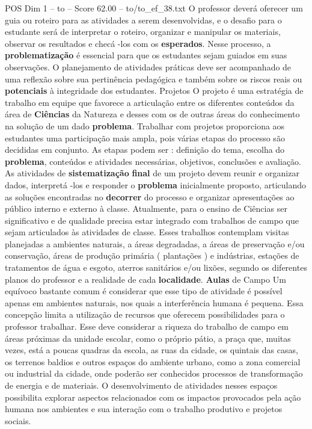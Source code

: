 \begin{textsample}{POS Dim 1 – to – Score 62.00 – to/to\_ef\_38.txt}
O professor deverá oferecer um guia ou roteiro para as atividades a serem desenvolvidas, e o desafio para o estudante será de interpretar o roteiro, organizar e manipular os materiais, observar os resultados e checá -los com os \textbf{esperados}.
Nesse processo, a \textbf{problematização} é essencial para que os estudantes sejam guiados em suas observações.
O planejamento de atividades práticas deve ser acompanhado de uma reflexão sobre sua pertinência pedagógica e também sobre os riscos reais ou \textbf{potenciais} à integridade dos estudantes.
Projetos O projeto é uma estratégia de trabalho em equipe que favorece a articulação entre os diferentes conteúdos da área de \textbf{Ciências} da Natureza e desses com os de outras áreas do conhecimento na solução de um dado \textbf{problema}.
Trabalhar com projetos proporciona aos estudantes uma participação mais ampla, pois várias etapas do processo são decididas em conjunto.
As etapas podem ser : definição do tema, escolha do \textbf{problema}, conteúdos e atividades necessárias, objetivos, conclusões e avaliação.
As atividades de \textbf{sistematização} \textbf{final} de um projeto devem reunir e organizar dados, interpretá -los e responder o \textbf{problema} inicialmente proposto, articulando as soluções encontradas no \textbf{decorrer} do processo e organizar apresentações ao público interno e externo à classe.
Atualmente, para o ensino de Ciências ser significativo e de qualidade precisa estar integrado com trabalhos de campo que sejam articulados às atividades de classe.
Esses trabalhos contemplam visitas planejadas a ambientes naturais, a áreas degradadas, a áreas de preservação e/ou conservação, áreas de produção primária ( plantações ) e indústrias, estações de tratamentos de água e esgoto, aterros sanitários e/ou lixões, segundo os diferentes planos do professor e a realidade de cada \textbf{localidade}. \textbf{Aulas} de Campo Um equívoco bastante comum é considerar que esse tipo de atividade é possível apenas em ambientes naturais, nos quais a interferência humana é pequena.
Essa concepção limita a utilização de recursos que oferecem possibilidades para o professor trabalhar.
Esse deve considerar a riqueza do trabalho de campo em áreas próximas da unidade escolar, como o próprio pátio, a praça que, muitas vezes, está a poucas quadras da escola, as ruas da cidade, os quintais das casas, os terrenos baldios e outros espaços do ambiente urbano, como a zona comercial ou industrial da cidade, onde poderão ser conhecidos processos de transformação de energia e de materiais.
O desenvolvimento de atividades nesses espaços possibilita explorar aspectos relacionados com os impactos provocados pela ação humana nos ambientes e sua interação com o trabalho produtivo e projetos sociais.

\end{textsample}
